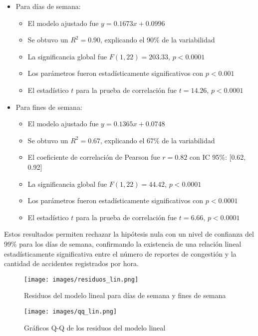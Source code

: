 \documentclass[12pt]{article}
\begin{document}
\begin{itemize}
    \item Para días de semana:
    \begin{itemize}
        \item El modelo ajustado fue $y = 0.1673x + 0.0996$
        \item Se obtuvo un $R^2 = 0.90$, explicando el 90\% de la variabilidad
        \item La significancia global fue $F(1, 22) = 203.33$, $p < 0.0001$
        \item Los parámetros fueron estadísticamente significativos con $p < 0.001$
        \item El estadístico $t$ para la prueba de correlación fue $t = 14.26$, $p < 0.0001$
    \end{itemize}

    \item Para fines de semana:
    \begin{itemize}
        \item El modelo ajustado fue $y = 0.1365x + 0.0748$
        \item Se obtuvo un $R^2 = 0.67$, explicando el 67\% de la variabilidad
        \item El coeficiente de correlación de Pearson fue $r = 0.82$ con IC 95\%: [0.62, 0.92]
        \item La significancia global fue $F(1, 22) = 44.42$, $p < 0.0001$
        \item Los parámetros fueron estadísticamente significativos con $p < 0.0001$
        \item El estadístico $t$ para la prueba de correlación fue $t = 6.66$, $p < 0.0001$
    \end{itemize}
\end{itemize}

Estos resultados permiten rechazar la hipótesis nula con un nivel de confianza del 99\% para los días de semana, confirmando la existencia de una relación lineal estadísticamente significativa entre el número de reportes de congestión y la cantidad de accidentes registrados por hora.

\begin{figure}[H]
\centering
\texttt{[image: images/residuos\_lin.png]}
\caption{Residuos del modelo lineal para días de semana y fines de semana}
\label{fig:resid_lin}
\end{figure}

\begin{figure}[H]
\centering
\texttt{[image: images/qq\_lin.png]}
\caption{Gráficos Q-Q de los residuos del modelo lineal}
\label{fig:qq_lin}
\end{figure}
\end{document}

